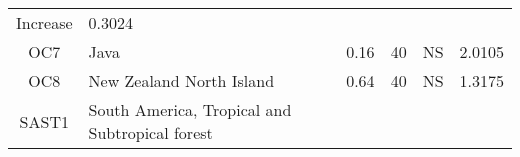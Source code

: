 \documentclass[]{article}
\begin{document}
\begin{longtable}[]{@{}clrccr@{}}
\begin{minipage}[t]{0.16\columnwidth}
Increase\strut
\end{minipage} & \begin{minipage}[t]{0.09\columnwidth}\raggedleft\strut
0.3024\strut
\end{minipage}\tabularnewline
\begin{minipage}[t]{0.08\columnwidth}\centering\strut
OC7\strut
\end{minipage} & \begin{minipage}[t]{0.29\columnwidth}\raggedright\strut
Java\strut
\end{minipage} & \begin{minipage}[t]{0.11\columnwidth}\raggedleft\strut
0.16\strut
\end{minipage} & \begin{minipage}[t]{0.10\columnwidth}\centering\strut
40\strut
\end{minipage} & \begin{minipage}[t]{0.16\columnwidth}\centering\strut
NS\strut
\end{minipage} & \begin{minipage}[t]{0.09\columnwidth}\raggedleft\strut
2.0105\strut
\end{minipage}\tabularnewline
\begin{minipage}[t]{0.08\columnwidth}\centering\strut
OC8\strut
\end{minipage} & \begin{minipage}[t]{0.29\columnwidth}\raggedright\strut
New Zealand North Island\strut
\end{minipage} & \begin{minipage}[t]{0.11\columnwidth}\raggedleft\strut
0.64\strut
\end{minipage} & \begin{minipage}[t]{0.10\columnwidth}\centering\strut
40\strut
\end{minipage} & \begin{minipage}[t]{0.16\columnwidth}\centering\strut
NS\strut
\end{minipage} & \begin{minipage}[t]{0.09\columnwidth}\raggedleft\strut
1.3175\strut
\end{minipage}\tabularnewline
\begin{minipage}[t]{0.08\columnwidth}\centering\strut
SAST1\strut
\end{minipage} & \begin{minipage}[t]{0.29\columnwidth}\raggedright\strut
South America, Tropical and Subtropical forest\strut
\end{minipage} & \begin{minipage}[t]{0.11\columnwidth}\raggedleft\strut

\end{minipage}
\end{longtable}
\end{document}
